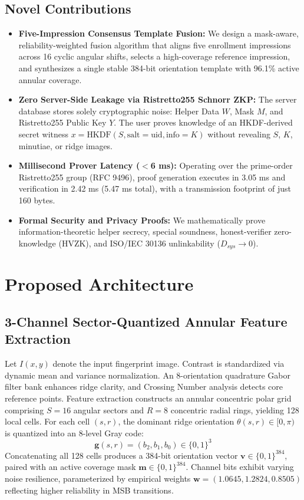 \documentclass[conference]{IEEEtran}
\begin{document}
\subsection{Novel Contributions}
\begin{itemize}
    \item \textbf{Five-Impression Consensus Template Fusion:} We design a mask-aware, reliability-weighted fusion algorithm that aligns five enrollment impressions across 16 cyclic angular shifts, selects a high-coverage reference impression, and synthesizes a single stable 384-bit orientation template with 96.1\% active annular coverage.
    \item \textbf{Zero Server-Side Leakage via Ristretto255 Schnorr ZKP:} The server database stores solely cryptographic noise: Helper Data $W$, Mask $M$, and Ristretto255 Public Key $Y$. The user proves knowledge of an HKDF-derived secret witness $x = \text{HKDF}(S, \text{salt}=\text{uid}, \text{info}=K)$ without revealing $S$, $K$, minutiae, or ridge images.
    \item \textbf{Millisecond Prover Latency ($<$6 ms):} Operating over the prime-order Ristretto255 group (RFC 9496), proof generation executes in 3.05 ms and verification in 2.42 ms (5.47 ms total), with a transmission footprint of just 160 bytes.
    \item \textbf{Formal Security and Privacy Proofs:} We mathematically prove information-theoretic helper secrecy, special soundness, honest-verifier zero-knowledge (HVZK), and ISO/IEC 30136 unlinkability ($D_{sys} \to 0$).
\end{itemize}

\section{Proposed Architecture}

\subsection{3-Channel Sector-Quantized Annular Feature Extraction}
Let $I(x,y)$ denote the input fingerprint image. Contrast is standardized via dynamic mean and variance normalization. An 8-orientation quadrature Gabor filter bank enhances ridge clarity, and Crossing Number analysis detects core reference points.
Feature extraction constructs an annular concentric polar grid comprising $S = 16$ angular sectors and $R = 8$ concentric radial rings, yielding 128 local cells. For each cell $(s, r)$, the dominant ridge orientation $\theta(s,r) \in [0, \pi)$ is quantized into an 8-level Gray code:
\begin{equation}
\mathbf{g}(s,r) = (b_2, b_1, b_0) \in \{0, 1\}^3
\end{equation}
Concatenating all 128 cells produces a 384-bit orientation vector $\mathbf{v} \in \{0, 1\}^{384}$, paired with an active coverage mask $\mathbf{m} \in \{0, 1\}^{384}$. Channel bits exhibit varying noise resilience, parameterized by empirical weights $\mathbf{w} = (1.0645, 1.2824, 0.8505)$ reflecting higher reliability in MSB transitions.
\end{document}
